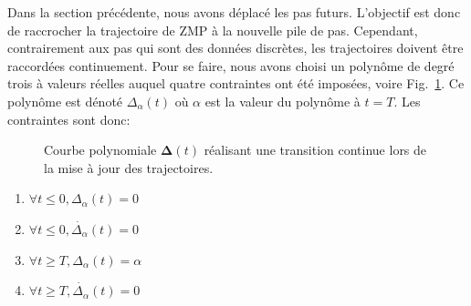 Dans la section précédente, nous avons déplacé les pas
futurs. L'objectif est donc de raccrocher la trajectoire de ZMP à la
nouvelle pile de pas. Cependant, contrairement aux pas qui sont des
données discrètes, les trajectoires doivent être raccordées
continuement. Pour se faire, nous avons choisi un polynôme de degré
trois à valeurs réelles auquel quatre contraintes ont été imposées,
voire Fig.~\ref{fig:transition}. Ce polynôme est dénoté
$\Delta_\alpha(t)$ où $\alpha$ est la valeur du polynôme à $t=T$. Les
contraintes sont donc:

\begin{figure}[ht!]
  \begin{center}

  \end{center}
  \caption{Courbe polynomiale $\mathbf{\Delta}(t)$ réalisant une
    transition continue lors de la mise à jour des
    trajectoires. \label{fig:transition}}
\end{figure}

\begin{enumerate}
\item $\forall t \leq 0, \Delta_\alpha(t) = 0$
\item $\forall t \leq 0, \dot{\Delta_\alpha}(t) = 0$
\item $\forall t \geq T, \Delta_\alpha(t) = \alpha$
\item $\forall t \geq T, \dot{\Delta_\alpha}(t) = 0$
\end{enumerate}

